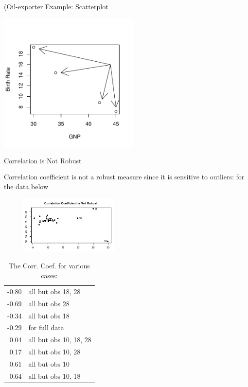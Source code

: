 \documentclass[14pt]{beamer}\usepackage[]{graphicx}\usepackage[]{color}
\begin{document}
\begin{frame}[fragile]{(Oil-exporter Example: Scatterplot}


\includegraphics[width=7cm]{figure/LBL13d-1} 


\end{frame}

\begin{frame}[fragile]{Correlation is Not Robust}

Correlation coefficient is not a robust measure since it is sensitive to  outliers: for the data below

\begin{minipage}[ht]{5cm}

\begin{figure}[htbp]
   \centering
   \includegraphics[width=5cm]{chapters/chapter13/figure/fig2.png} %
\end{figure}

\end{minipage}
\begin{minipage}[ht]{6cm}

\begin{table}[ht]
{\small{
\caption{The Corr. Coef. for various cases:}
\begin{tabular}{@{} rl @{}} \hline
-0.80 & all but obs 18, 28 \\
-0.69 & all but obs 28 \\
-0.34 & all but obs 18 \\
-0.29 & for full data \\
0.04  & all but obs 10, 18, 28 \\
0.17  & all but obs 10, 28 \\
0.61  & all but obs 10 \\
0.64  & all but obs 10, 18 \\ \hline
\end{tabular}
}}
\end{table}
\end{minipage}
\end{frame}
\end{document}
